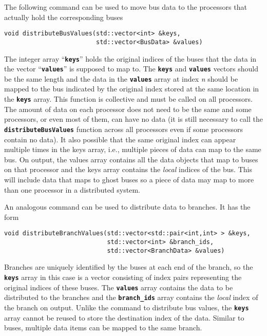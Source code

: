 The following command can be used to move bus data to the processors that actually hold the corresponding buses

{
\color{red}
\begin{Verbatim}[fontseries=b]
void distributeBusValues(std::vector<int> &keys,
                         std::vector<BusData> &values)
\end{Verbatim}
}

The integer array ``\texttt{\textbf{keys}}'' holds the original indices of the
buses that the data in the vector ``\texttt{\textbf{values}}'' is supposed to
map to. The \texttt{\textbf{keys}} and \texttt{\textbf{values}} vectors should
be the same length and the data in the \texttt{\textbf{values}} array at index \textit{n} should be mapped to the bus indicated by the original index stored at the same location in the \texttt{\textbf{keys}} array. This function is collective and must be called on all processors. The amount of data on each processor does not need to be the same and some processors, or even most of them, can have no data (it is still necessary to call the \texttt{\textbf{distributeBusValues}} function across all processors even if some processors contain no data). It also possible that the same original index can appear multiple times in the keys array, i.e., multiple pieces of data can map to the same bus. On output, the values array contains all the data objects that map to buses on that processor and the keys array contains the \textit{local} indices of the bus. This will include data that maps to ghost buses so a piece of data may map to more than one processor in a distributed system.

An analogous command can be used to distribute data to branches. It has the form

{
\color{red}
\begin{Verbatim}[fontseries=b]
void distributeBranchValues(std::vector<std::pair<int,int> > &keys,
                            std::vector<int> &branch_ids,
                            std::vector<BranchData> &values)
\end{Verbatim}
}

Branches are uniquely identified by the buses at each end of the branch, so the \texttt{\textbf{keys}} array in this case is a vector consisting of index pairs representing the original indices of these buses. The \texttt{\textbf{values}} array contains the data to be distributed to the branches and the \texttt{\textbf{branch\_ids}} array contains the \textit{local} index of the branch on output. Unlike the command to distribute bus values, the \texttt{\textbf{keys}} array cannot be reused to store the destination index of the data. Similar to buses, multiple data items can be mapped to the same branch.

